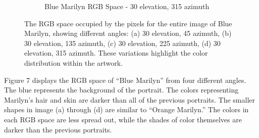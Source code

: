 \documentclass{article}
\begin{document}
\begin{figure}[ht]
\begin{subfigure}{0.45\textwidth}
    \caption{Blue Marilyn RGB Space - 30 \degree elevation, 315 \degree azimuth}
    \label{fig:4_16_blue_marilyn_original_scatter}
  \end{subfigure}
  \caption{The RGB space occupied by the pixels for the entire image of Blue Marilyn, showing different angles: (a) 30 \degree elevation, 45 \degree azimuth, (b) 30 \degree elevation, 135 \degree azimuth, (c) 30 \degree elevation, 225 \degree azimuth, (d) 30 \degree elevation, 315 \degree azimuth. These variations highlight the color distribution within the artwork.}
  \label{fig:blue_marilyn_original_scatter_2}
\end{figure}

Figure 7 displays the RGB space of ``Blue Marilyn'' from four different
angles. The blue represents the background of the portrait. The colors
representing Marilyn's hair and skin are darker than all of the previous
portraits. The smaller shapes in image (a) through (d) are similar to
``Orange Marilyn.'' The colors in each RGB space are less spread out,
while the shades of color themselves are darker than the previous
portraits.
\end{document}
